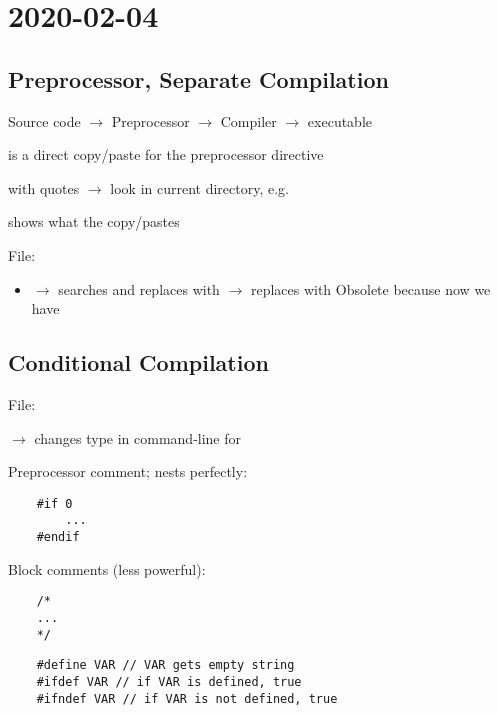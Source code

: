 \section{2020-02-04}
\subsection{Preprocessor, Separate Compilation}
Source code $ \rightarrow $ Preprocessor $ \rightarrow $ Compiler
$ \rightarrow $  executable

 is a direct copy/paste for the preprocessor directive

 with quotes $ \rightarrow $ look in current directory,
e.g. 

 shows what the  copy/pastes


File: 

\begin{itemize}
    \item {} $ \rightarrow $ searches and replaces
     with 
    \subitem {} $ \rightarrow $ replaces  with 
    \subitem Obsolete because now we have 
\end{itemize}

\subsection{Conditional Compilation}
File: 

 $ \rightarrow $ changes type in command-line
for 

Preprocessor comment; nests perfectly:
\begin{lstlisting}
    #if 0
        ...
    #endif
\end{lstlisting}

Block comments (less powerful):
\begin{lstlisting}
    /*
    ...
    */
\end{lstlisting}

\begin{lstlisting}
    #define VAR // VAR gets empty string
    #ifdef VAR // if VAR is defined, true
    #ifndef VAR // if VAR is not defined, true
\end{lstlisting}


